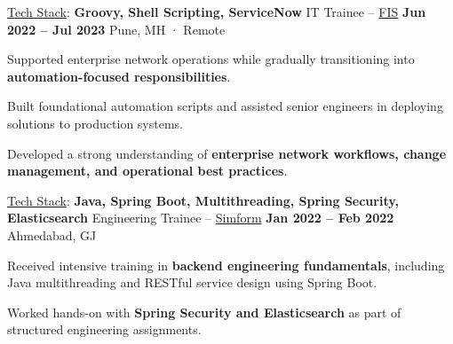 \documentclass[11pt, a4paper]{awesome-cv}
\begin{document}
\begin{cventries}
\vspace{1.2em}

\cventry
  {\underline{Tech Stack}: \textbf{Groovy, Shell Scripting, ServiceNow}}
  {IT Trainee – \underline{FIS}}
  {\textbf{Jun 2022 – Jul 2023}}
  {Pune, MH · Remote}
  {
    \begin{cvitems}
      \item {Supported enterprise network operations while gradually transitioning into \textbf{automation-focused responsibilities}.}
      \item {Built foundational automation scripts and assisted senior engineers in deploying solutions to production systems.}
      \item {Developed a strong understanding of \textbf{enterprise network workflows, change management, and operational best practices}.}
    \end{cvitems}
  }

\vspace{1.2em}

\cventry
  {\underline{Tech Stack}: \textbf{Java, Spring Boot, Multithreading, Spring Security, Elasticsearch}}
  {Engineering Trainee – \underline{Simform}}
  {\textbf{Jan 2022 – Feb 2022}}
  {Ahmedabad, GJ}
  {
    \begin{cvitems}
      \item {Received intensive training in \textbf{backend engineering fundamentals}, including Java multithreading and RESTful service design using Spring Boot.}
      \item {Worked hands-on with \textbf{Spring Security and Elasticsearch} as part of structured engineering assignments.}
    \end{cvitems}
  }

\end{cventries}

\end{document}
